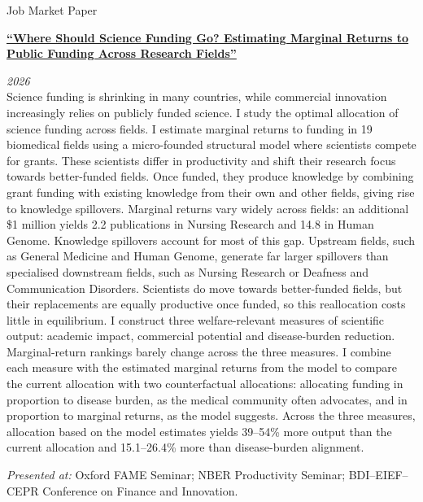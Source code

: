 \documentclass{resume} %
\begin{document}
\begin{rSection}{Job Market Paper}

\parbox[t]{0.82\linewidth}{\textbf{\href{https://fbares.github.io/assets/papers/where-should-science-funding-go.pdf}{``Where Should Science Funding Go? Estimating Marginal Returns to Public Funding Across Research Fields''}}} \hfill {\em 2026} \\
Science funding is shrinking in many countries, while commercial innovation increasingly relies on publicly funded science. I study the optimal allocation of science funding across fields. I 
estimate marginal returns to funding in 19 biomedical fields using a micro-founded structural model where scientists compete for grants. These scientists differ in productivity and shift their research focus towards better-funded fields. Once funded, they produce knowledge by combining grant funding with existing knowledge from their own and other fields, giving rise to knowledge spillovers. Marginal returns vary widely across fields: an additional \$1 million yields 2.2 publications in Nursing Research and 14.8 in Human Genome. Knowledge spillovers account for most of this gap. Upstream fields, such as General Medicine and Human Genome, generate far larger spillovers than specialised downstream fields, such as Nursing Research or Deafness and Communication Disorders. Scientists do move towards better-funded fields, but their replacements are equally productive once funded, so this reallocation costs little in equilibrium. I construct three welfare-relevant measures of scientific output: academic impact, commercial potential and disease-burden reduction. Marginal-return rankings barely change across the three measures. I combine each measure with the estimated marginal returns from the model to compare the current allocation with two counterfactual allocations: allocating funding in proportion to disease burden, as the medical community often advocates, and in proportion to marginal returns, as the model suggests. Across the three measures, allocation based on the model estimates yields 39--54\% more output than the current allocation and 15.1--26.4\% more than disease-burden alignment.

\textit{Presented at:} Oxford FAME Seminar; NBER Productivity Seminar; BDI--EIEF--CEPR Conference on Finance and Innovation.

\end{rSection}
\end{document}

